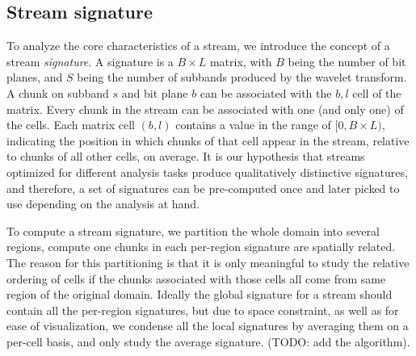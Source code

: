 \subsection{Stream signature}

To analyze the core characteristics of a stream, we introduce the concept of a stream
\emph{signature}. A signature is a $B \times L$ matrix, with $B$ being the number of bit planes, and
$S$ being the number of subbands produced by the wavelet transform. A chunk on subband $s$ and bit
plane $b$ can be associated with the $b, l$ cell of the matrix. Every chunk in the stream can be
associated with one (and only one) of the cells. Each matrix cell $(b,l)$ contains a value in the
range of $[0,B\times L)$, indicating the position in which chunks of that cell appear in the stream,
relative to chunks of all other cells, on average. It is our hypothesis that streams optimized for
different analysis tasks produce qualitatively distinctive signatures, and therefore, a set of
signatures can be pre-computed once and later picked to use depending on the analysis at hand.

To compute a stream signature, we partition the whole domain into several regions, compute one
chunks in each per-region signature are spatially related. The reason for this partitioning is that
it is only meaningful to study the relative ordering of cells if the chunks associated with those
cells all come from same region of the original domain. Ideally the global signature for a stream
should contain all the per-region signatures, but due to space constraint, as well as for ease of
visualization, we condense all the local signatures by averaging them on a per-cell basis, and only
study the average signature. (TODO: add the algorithm).

